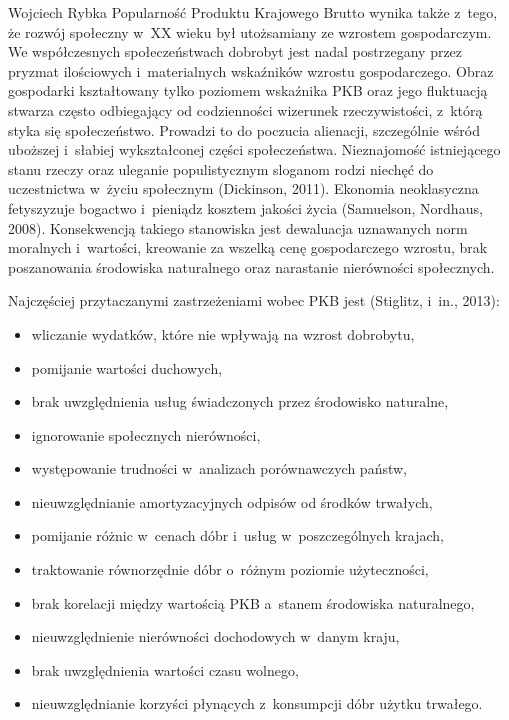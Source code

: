 \begin{artplenv}{Wojciech Rybka}
Popularność Produktu Krajowego Brutto wynika także z~tego, że rozwój społeczny w~XX wieku był utożsamiany ze wzrostem
gospodarczym. We współczesnych społeczeństwach dobrobyt jest nadal postrzegany przez pryzmat ilościowych i~materialnych
wskaźników wzrostu gospodarczego. Obraz gospodarki kształtowany tylko poziomem wskaźnika PKB oraz jego fluktuacją
stwarza często odbiegający od codzienności wizerunek rzeczywistości, z~którą styka się społeczeństwo. Prowadzi to do
poczucia alienacji, szczególnie wśród uboższej i~słabiej wykształconej części społeczeństwa. Nieznajomość istniejącego
stanu rzeczy oraz uleganie populistycznym sloganom rodzi niechęć do uczestnictwa w~życiu społecznym
\label{ref:RND7HXSo00QDy}(Dickinson, 2011). Ekonomia neoklasyczna fetyszyzuje bogactwo i~pieniądz kosztem jakości życia
\label{ref:RNDdvfwdbGiAi}(Samuelson, Nordhaus, 2008). Konsekwencją takiego stanowiska jest dewaluacja uznawanych norm
moralnych i~wartości, kreowanie za wszelką cenę gospodarczego wzrostu, brak poszanowania środowiska naturalnego oraz
narastanie nierówności społecznych. 

Najczęściej przytaczanymi zastrzeżeniami wobec PKB jest \label{ref:RNDE7TGfSbEuZ}(Stiglitz, i~in., 2013):

\begin{itemize}
\item wliczanie wydatków, które nie wpływają na wzrost dobrobytu,
\item pomijanie wartości duchowych,
\item brak uwzględnienia usług świadczonych przez środowisko naturalne,
\item ignorowanie społecznych nierówności,
\item występowanie trudności w~analizach porównawczych państw, 
\item nieuwzględnianie amortyzacyjnych odpisów od środków trwałych, 
\item pomijanie różnic w~cenach dóbr i~usług w~poszczególnych krajach,
\item traktowanie równorzędnie dóbr o~różnym poziomie użyteczności,
\item brak korelacji między wartością PKB a~stanem środowiska naturalnego,
\item nieuwzględnienie nierówności dochodowych w~danym kraju,
\item brak uwzględnienia wartości czasu wolnego,
\item nieuwzględnianie korzyści płynących z~konsumpcji dóbr użytku trwałego.
\end{itemize}


\end{artplenv}
